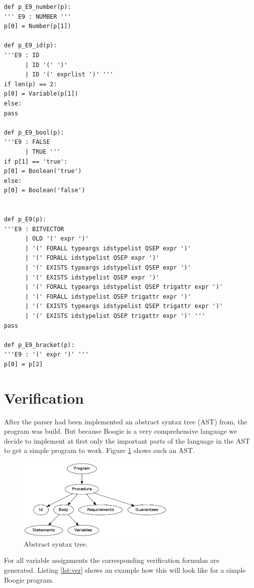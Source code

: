 \documentclass[paper=a4, fontsize=12pt]{scrartcl}
\begin{document}
\begin{lstlisting}[caption=Parser code example, label=lst:e9]
def p_E9_number(p):
''' E9 : NUMBER '''
p[0] = Number(p[1])

def p_E9_id(p):
'''E9 : ID
      | ID '(' ')'
      | ID '(' exprlist ')' '''
if len(p) == 2:
p[0] = Variable(p[1])
else:
pass 

def p_E9_bool(p):
'''E9 : FALSE
      | TRUE '''
if p[1] == 'true':
p[0] = Boolean('true')
else:
p[0] = Boolean('false')	


def p_E9(p):
'''E9 : BITVECTOR
      | OLD '(' expr ')'
      | '(' FORALL typeargs idstypelist QSEP expr ')'
      | '(' FORALL idstypelist QSEP expr ')'
      | '(' EXISTS typeargs idstypelist QSEP expr ')'
      | '(' EXISTS idstypelist QSEP expr ')'
      | '(' FORALL typeargs idstypelist QSEP trigattr expr ')'
      | '(' FORALL idstypelist QSEP trigattr expr ')'
      | '(' EXISTS typeargs idstypelist QSEP trigattr expr ')'
      | '(' EXISTS idstypelist QSEP trigattr expr ')' '''
pass

def p_E9_bracket(p):
'''E9 : '(' expr ')' '''
p[0] = p[2]
\end{lstlisting}

\section{Verification}
After the parser had been implemented an abstract syntax tree (AST) from, the program was build. But because Boogie is a very comprehensive language we decide to implement at first only the important parts of the language in the AST to get a simple program to work. Figure \ref{fig:ast} shows such an AST. 

\begin{figure}[ht]
  \centering
    \includegraphics[height=4cm]{ast}
    \caption{Abstract syntax tree.}
  \label{fig:ast}
\end{figure}

For all variable assignments the corresponding verification formulas are generated. Listing \ref{lst:ver} shows an example how this will look like for a simple Boogie program.
\end{document}
